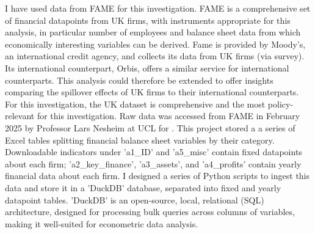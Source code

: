 I have used data from FAME for this investigation.
FAME is a comprehensive set of financial datapoints from UK firms, with instruments appropriate for this analysis,
in particular number of employees and balance sheet data from which economically interesting variables can be derived.
Fame is provided by Moody's, an international credit agency, and collects its data from UK firms (via survey).
\newline
Its international counterpart, Orbis, offers a similar service for international counterparts.
This analysis could therefore be extended to offer insights comparing the spillover effects of UK firms to their international counterparts.
For this investigation, the UK dataset is comprehensive and the most policy-relevant for this investigation.
\newline
Raw data was accessed from FAME in February 2025 by Professor Lars Nesheim at UCL for \citep{Irastorza-Fadrique2026}.
This project stored a a series of Excel tables splitting financial balance sheet variables by their category.
Downloadable indicators under 'a1\_ID' and 'a5\_misc' contain fixed datapoints about each firm; 'a2\_key\_finance',
'a3\_assets', and 'a4\_profits' contain yearly financial data about each firm.
I designed a series of Python scripts to ingest this data and store it in a 'DuckDB' database,
separated into fixed and yearly datapoint tables. 'DuckDB' is an open-source, local, relational (SQL) architecture,
designed for processing bulk queries across columns of variables, making it well-suited for econometric data analysis.
